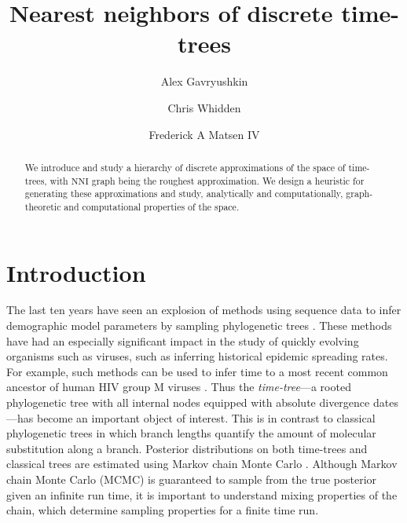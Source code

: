 \documentclass{amsart}
\theoremstyle{definition}
\newcommand{\nni}{\mathrm{NNI}}
\begin{document}
\title{Nearest neighbors of discrete time-trees}


\author{Alex Gavryushkin}
\address{Centre for Computational Evolution, The University of Auckland, New Zealand}

\author{Chris Whidden}
\address{Program in Computational Biology, Fred Hutchinson Cancer Research Center, Seattle, WA 98109}

\author{Frederick A Matsen IV}


\begin{abstract}
We introduce and study a hierarchy of discrete approximations of the space of time-trees, with $\nni$ graph being the roughest approximation.
We design a heuristic for generating these approximations and study, analytically and computationally, graph-theoretic and computational properties of the space.
\iftoggle{curvatureON}{
We also investigate the Ricci-Ollivier curvature of basic random walks on the space.
}{}
\end{abstract}


\maketitle


\section{Introduction}
The last ten years have seen an explosion of methods using sequence data to infer demographic model parameters by sampling phylogenetic trees \autocite{Kuhner1995-mj,Kuhner1998-tq,Kuhner2000-af,Beerli2001-sc,Kuhner2006-vx,Drummond2002,Drummond2005-ks,Drummond2006-oa,Minin2008-wz}.
These methods have had an especially significant impact in the study of quickly evolving organisms such as viruses, such as inferring historical epidemic spreading rates.
For example, such methods can be used to infer time to a most recent common ancestor of human HIV group M viruses \autocite{Worobey2008-rt,Baele2013-op}.
Thus the \emph{time-tree}---a rooted phylogenetic tree with all internal nodes equipped with absolute divergence dates---has become an important object of interest.
This is in contrast to classical phylogenetic trees in which branch lengths quantify the amount of molecular substitution along a branch.
Posterior distributions on both time-trees and classical trees are estimated using Markov chain Monte Carlo \autocite{Mau1997-sq,Yang1997-gv,Drummond2002}.
Although Markov chain Monte Carlo (MCMC) is guaranteed to sample from the true posterior given an infinite run time, it is important to understand mixing properties of the chain, which determine sampling properties for a finite time run.
\end{document}

